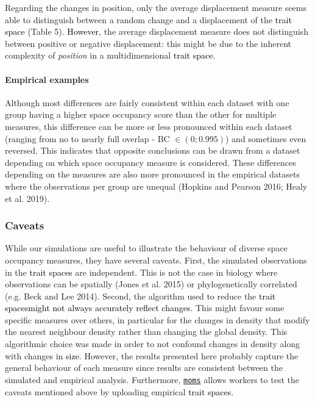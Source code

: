 \documentclass[]{article}
\let\oldparagraph\paragraph
\renewcommand{\paragraph}[1]{\oldparagraph{#1}\mbox{}}
\begin{document}
Regarding the changes in position, only the average displacement measure
seems able to distinguish between a random change and a displacement of
the \textcolor{black}{trait space} (Table 5).
\textcolor{black}{However}, the average displacement measure
does not distinguish between positive or negative displacement: this
might be due to the inherent complexity of \emph{position} in a
multidimensional \textcolor{black}{trait space}.

\paragraph{Empirical examples}\label{empirical-examples-1}

Although most differences are fairly consistent within each dataset with
one group having a higher space occupancy score than the other for
multiple measures, this difference can be more or less pronounced within
each dataset (ranging from no to nearly full overlap - BC
\(\in(0;0.995)\)) and sometimes even reversed. This indicates that
opposite conclusions can be drawn from a dataset depending on which
space occupancy measure is considered. These differences depending on
the measures are also more pronounced in the empirical datasets where
the observations per group are unequal (Hopkins and Pearson 2016; Healy
et al. 2019).

\subsubsection{Caveats}\label{caveats}

While our simulations are useful to illustrate the behaviour of diverse
space occupancy measures, they have several caveats. First, the
simulated observations in the \textcolor{black}{trait spaces}
are independent. This is not the case in biology where observations can
be spatially (Jones et al. 2015) or phylogenetically correlated (e.g.
Beck and Lee 2014). Second, the algorithm used to reduce the
\textcolor{black}{trait spacesmight not always accurately reflect changes}.
This might favour some specific measures over others, in particular for
the changes in density that modify the nearest neighbour density rather
than changing the global density. This algorithmic choice was made in
order to not confound changes in density along with changes in
\textcolor{black}{size}. However, the results presented here
probably capture the general behaviour of each measure since results are
consistent between the simulated and empirical analysis. Furthermore,
\href{https://tguillerme.shinyapps.io/moms/}{\texttt{moms}} allows
workers to test the caveats mentioned above by uploading empirical
\textcolor{black}{trait spaces}.
\end{document}
